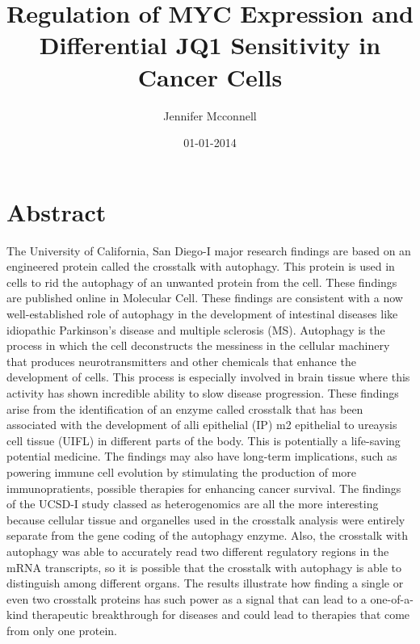 \documentclass{article}%
\title{Regulation of MYC Expression and Differential JQ1 Sensitivity in Cancer Cells}%
\author{Jennifer Mcconnell}%
\affil{Nephrology Unit, Department of Medicine, Faculty of Medicine, Thammasat University (Rangsit Campus), Khlong Nueng, Khlong Luang, Pathum Thani 12121, Thailand}%
\date{01{-}01{-}2014}%
\begin{document}
%
\normalsize%
\maketitle%
\section{Abstract}%
\label{sec:Abstract}%
The University of California, San Diego{-}I major research findings are based on an engineered protein called the crosstalk with autophagy. This protein is used in cells to rid the autophagy of an unwanted protein from the cell. These findings are published online in Molecular Cell.\newline%
These findings are consistent with a now well{-}established role of autophagy in the development of intestinal diseases like idiopathic Parkinson's disease and multiple sclerosis (MS).\newline%
Autophagy is the process in which the cell deconstructs the messiness in the cellular machinery that produces neurotransmitters and other chemicals that enhance the development of cells. This process is especially involved in brain tissue where this activity has shown incredible ability to slow disease progression.\newline%
These findings arise from the identification of an enzyme called crosstalk that has been associated with the development of alli epithelial (IP)  m2  epithelial to ureaysis cell tissue (UIFL) in different parts of the body. This is potentially a life{-}saving potential medicine. The findings may also have long{-}term implications, such as powering immune cell evolution by stimulating the production of more immunopratients, possible therapies for enhancing cancer survival.\newline%
The findings of the UCSD{-}I study  classed as heterogenomics  are all the more interesting because cellular tissue and organelles used in the crosstalk analysis were entirely separate from the gene coding of the autophagy enzyme. Also, the crosstalk with autophagy was able to accurately read two different regulatory regions in the mRNA transcripts, so it is possible that the crosstalk with autophagy is able to distinguish among different organs.\newline%
The results illustrate how finding a single or even two crosstalk proteins has such power as a signal that can lead to a one{-}of{-}a{-}kind therapeutic breakthrough for diseases and could lead to therapies that come from only one protein.\newline%
\end{document}
